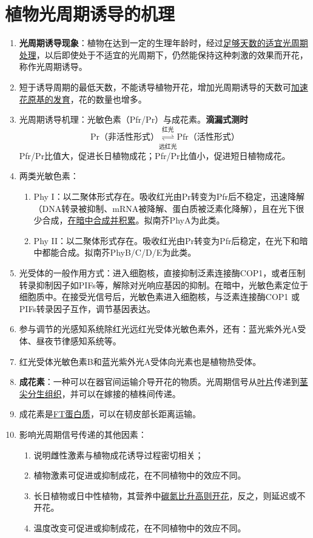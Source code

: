 \section{植物光周期诱导的机理}
\begin{enumerate}
    \item \textbf{光周期诱导现象}：植物在达到一定的生理年龄时，经过\uline{足够天数的适宜光周期处理}，以后即使处于不适宜的光周期下，仍然能保持这种刺激的效果而开花，称作光周期诱导。
    \item 短于诱导周期的最低天数，不能诱导植物开花，增加光周期诱导的天数可\uline{加速花原基的发育}，花的数量也增多。
    \item 光周期诱导机理：光敏色素（Pfr/Pr）与成花素。\textbf{滴漏式测时}
    \[
        \text{Pr（非活性形式）}\overset{\text{红光}}{\underset{\text{远红光}}\rightleftharpoons}\text{Pfr（活性形式）}
    \]
    Pfr/Pr比值大，促进长日植物成花；Pfr/Pr比值小，促进短日植物成花。
    \item 两类光敏色素：
    \begin{enumerate}
        \item Phy I：以二聚体形式存在。吸收红光由Pr转变为Pfr后不稳定，迅速降解（DNA转录被抑制、mRNA被降解、蛋白质被泛素化降解），且在光下很少合成，\uline{在暗中合成并积累}。拟南芥PhyA为此类。
        \item Phy II：以二聚体形式存在。吸收红光由Pr转变为Pfr后稳定，在光下和暗中都能合成。拟南芥PhyB/C/D/E为此类。
    \end{enumerate}
    \item 光受体的一般作用方式：进入细胞核，直接抑制泛素连接酶COP1，或者压制转录抑制因子如PIFs等，解除对光响应基因的抑制。在暗中，光敏色素定位于细胞质中。在接受光信号后，光敏色素进入细胞核，与泛素连接酶COP1 或PIFs转录因子互作，调节基因表达。
    \item 参与调节的光感知系统除红光远红光受体光敏色素外，还有：蓝光紫外光A受体、昼夜节律感知系统等。
    \item 红光受体光敏色素B和蓝光紫外光A受体向光素也是植物热受体。
    \item \textbf{成花素}：一种可以在器官间运输介导开花的物质。光周期信号从\uline{叶片}传递到\uline{茎尖分生组织}，并可以在嫁接的植株间传递。
    \item 成花素是\uline{FT蛋白质}，可以在韧皮部长距离运输。
    \item 影响光周期信号传递的其他因素：
    \begin{enumerate}
        \item 说明雌性激素与植物成花诱导过程密切相关；
        \item 植物激素可促进或抑制成花，在不同植物中的效应不同。
        \item 长日植物或日中性植物，其营养中\uline{碳氮比升高则开花}，反之，则延迟或不开花。
        \item 温度改变可促进或抑制成花，在不同植物中的效应不同。
    \end{enumerate}
\end{enumerate}


